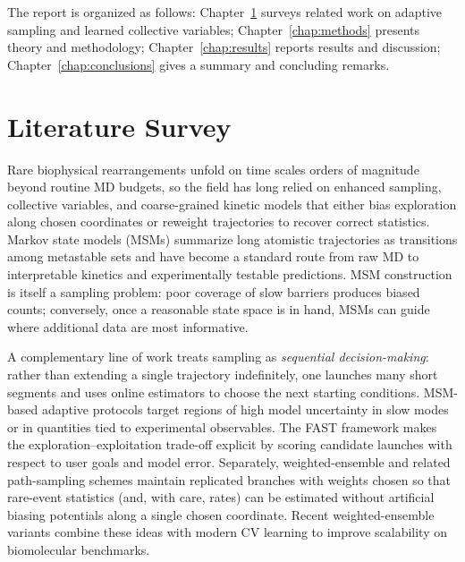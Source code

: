 The report is organized as follows: Chapter~\ref{chap:lit} surveys related work on adaptive sampling and learned collective variables; Chapter~\ref{chap:methods} presents theory and methodology; Chapter~\ref{chap:results} reports results and discussion; Chapter~\ref{chap:conclusions} gives a summary and concluding remarks.

\chapter{Literature Survey}\label{chap:lit}

Rare biophysical rearrangements unfold on time scales orders of magnitude beyond routine MD budgets, so the field has long relied on enhanced sampling, collective variables, and coarse-grained kinetic models that either bias exploration along chosen coordinates or reweight trajectories to recover correct statistics.\cite{lindorff2011how,chodera2014markov,laio2002escaping,barducci2008well,tribello2014plumed2}
Markov state models (MSMs) summarize long atomistic trajectories as transitions among metastable sets and have become a standard route from raw MD to interpretable kinetics and experimentally testable predictions.\cite{prinz2011markov,husic2018markov,plattner2017complete}
MSM construction is itself a sampling problem: poor coverage of slow barriers produces biased counts; conversely, once a reasonable state space is in hand, MSMs can guide where additional data are most informative.

A complementary line of work treats sampling as \emph{sequential decision-making}: rather than extending a single trajectory indefinitely, one launches many short segments and uses online estimators to choose the next starting conditions.
MSM-based adaptive protocols target regions of high model uncertainty in slow modes or in quantities tied to experimental observables.\cite{bowman2010adaptive}
The FAST framework makes the exploration--exploitation trade-off explicit by scoring candidate launches with respect to user goals and model error.\cite{zimmerman2015fast}
Separately, weighted-ensemble and related path-sampling schemes maintain replicated branches with weights chosen so that rare-event statistics (and, with care, rates) can be estimated without artificial biasing potentials along a single chosen coordinate.\cite{huber1996we,zuckerman2017weighted}
Recent weighted-ensemble variants combine these ideas with modern CV learning to improve scalability on biomolecular benchmarks.\cite{yang2024werl,leung2025dlwe}

